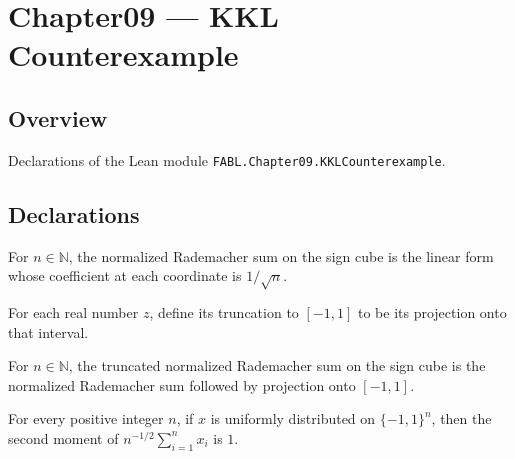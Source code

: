 \chapter{Chapter09 — KKL Counterexample}
\section{Overview}

Declarations of the Lean module \texttt{FABL.Chapter09.KKLCounterexample}.

\section{Declarations}

\begin{definition}
\label{FABL.kklNormalizedRademacherSum}
\leanok
{}
For $n\in\mathbb N$, the normalized Rademacher sum on the sign cube is the linear form
whose coefficient at each coordinate is $1/\sqrt n$.
\end{definition}

\begin{definition}
\label{FABL.truncateUnit}
\leanok
For each real number $z$, define its truncation to $[-1,1]$ to be its projection onto
that interval.
\end{definition}

\begin{definition}
\label{FABL.truncatedNormalizedRademacherSum}
\leanok
{}
For $n\in\mathbb N$, the truncated normalized Rademacher sum on the sign cube is the
normalized Rademacher sum followed by projection onto $[-1,1]$.
\end{definition}

\begin{theorem}
\label{FABL.normalizedRademacherSum_secondMoment}
\leanok
{}
For every positive integer $n$, if $x$ is uniformly distributed on $\{−1,1\}^n$, then
the second moment of $n^{-1/2}\sum_{i=1}^n x_i$ is $1$.
\end{theorem}

